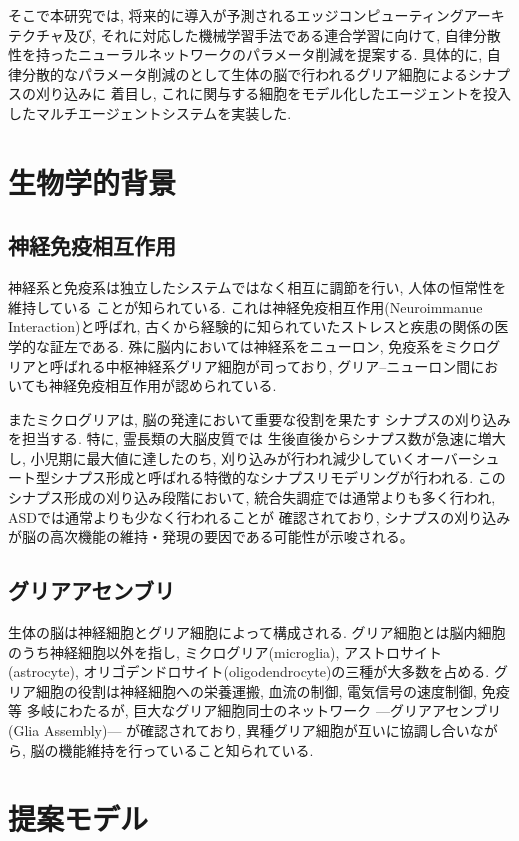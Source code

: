 \documentclass[a4paper,10.5pt,twocolumn]{jsarticle}
\begin{document}
そこで本研究では, 将来的に導入が予測されるエッジコンピューティングアーキテクチャ及び, 
それに対応した機械学習手法である連合学習に向けて, 
自律分散性を持ったニューラルネットワークのパラメータ削減を提案する.
具体的に, 自律分散的なパラメータ削減のとして生体の脳で行われるグリア細胞によるシナプスの刈り込みに
着目し, これに関与する細胞をモデル化したエージェントを投入したマルチエージェントシステムを実装した.
\section{生物学的背景}
\subsection{神経免疫相互作用}
神経系と免疫系は独立したシステムではなく相互に調節を行い, 人体の恒常性を維持している
ことが知られている.
これは神経免疫相互作用(Neuroimmanue Interaction)と呼ばれ, 
古くから経験的に知られていたストレスと疾患の関係の医学的な証左である.
殊に脳内においては神経系をニューロン, 免疫系をミクログリアと呼ばれる中枢神経系グリア細胞が司っており, 
グリア--ニューロン間においても神経免疫相互作用が認められている\cite{Neuron-Glia}.

またミクログリアは, 脳の発達において重要な役割を果たす
シナプスの刈り込みを担当する.
特に, 霊長類の大脳皮質では
生後直後からシナプス数が急速に増大し, 小児期に最大値に達したのち, 
刈り込みが行われ減少していくオーバーシュート型シナプス形成と呼ばれる特徴的なシナプスリモデリングが行われる.
このシナプス形成の刈り込み段階において, 
統合失調症では通常よりも多く行われ, ASDでは通常よりも少なく行われることが
確認されており, シナプスの刈り込みが脳の高次機能の維持・発現の要因である可能性が示唆される。
\subsection{グリアアセンブリ}
\label{sec:g-asem}
生体の脳は神経細胞とグリア細胞によって構成される.
グリア細胞とは脳内細胞のうち神経細胞以外を指し, 
ミクログリア(microglia), アストロサイト(astrocyte),
オリゴデンドロサイト(oligodendrocyte)の三種が大多数を占める.
グリア細胞の役割は神経細胞への栄養運搬, 血流の制御, 電気信号の速度制御, 免疫等
多岐にわたるが, 巨大なグリア細胞同士のネットワーク 
---グリアアセンブリ(Glia Assembly)--- 
が確認されており, 異種グリア細胞が互いに協調し合いながら, 
脳の機能維持を行っていること知られている.
\section{提案モデル}
\end{document}
